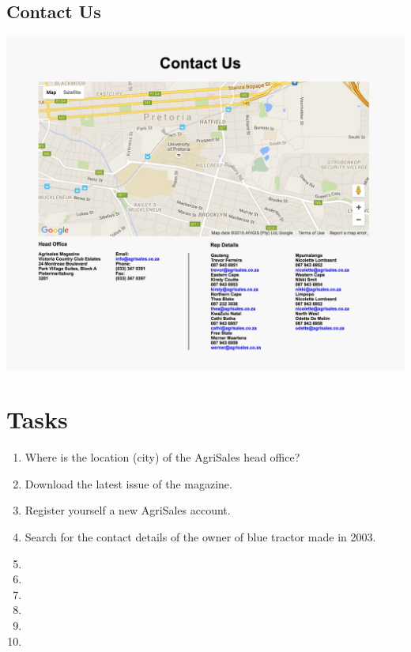 \documentclass[11pt]{article}
\begin{document}
	\subsection{Contact Us}
		\includegraphics[width=\textwidth]{../Images/ContactUs}

\newpage

\section{Tasks}
	\begin{enumerate}
		\item Where is the location (city) of the AgriSales head office?
		\item Download the latest issue of the magazine.
		\item Register yourself a new AgriSales account.
		\item Search for the contact details of the owner of blue tractor made in 2003.
		\item 
		\item 
		\item 
		\item 
		\item 
		\item 
	\end{enumerate}
\end{document}
